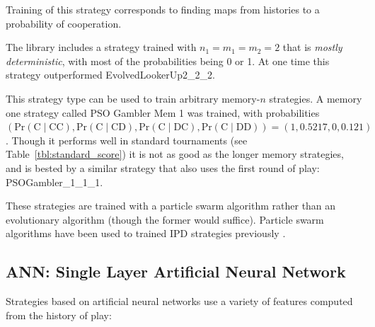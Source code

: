 \documentclass{article}
\begin{document}
Training of this strategy corresponds to finding maps from histories to
a probability of cooperation.

The library includes a strategy trained
with $n_1 = m_1 = m_2 = 2$ that is \emph{mostly deterministic}, with most of the
probabilities being 0 or 1. At one time this strategy outperformed
EvolvedLookerUp2\_2\_2.

This strategy type can be used to train arbitrary memory-$n$ strategies. A
memory one strategy called PSO Gambler Mem 1 was trained, with
probabilities $(\text{Pr}(\text{C}\;|\;\text{CC}),
                \text{Pr}(\text{C}\;|\;\text{CD}),
                \text{Pr}(\text{C}\;|\;\text{DC}),
                \text{Pr}(\text{C}\;|\;\text{DD})) = (1, 0.5217, 0, 0.121)$.
Though it performs well in standard tournaments (see
Table~\ref{tbl:standard_score})
it is not as good as the longer memory strategies, and is bested by a similar
strategy that also uses the first round of play: PSOGambler\_1\_1\_1.

These strategies are trained with a particle swarm algorithm rather than an
evolutionary algorithm (though the former would suffice). Particle swarm
algorithms have been used to trained IPD strategies previously
\cite{franken2005particle}.

\subsection{ANN: Single Layer Artificial Neural Network}

Strategies based on artificial neural networks use a variety of features
computed from the history of play:
\end{document}
